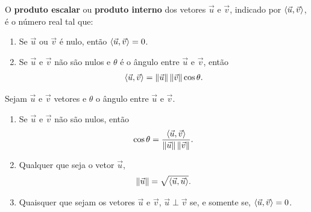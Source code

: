 \documentclass{beamer}
\begin{document}
    \begin{frame}
        \begin{definicao}\label{produtointerno}
          O \textbf{produto escalar} ou \textbf{produto interno} dos vetores $\vec{u}$ e $\vec{v}$, indicado por $\langle \vec{u}, \vec{v} \rangle$, é o número real tal que:
          \begin{enumerate}[label=({\roman*})]
            \item Se $\vec{u}$ ou $\vec{v}$ é nulo, então $\langle \vec{u}, \vec{v} \rangle = 0$.
            \item Se $\vec{u}$ e $\vec{v}$ não são nulos e $\theta$ é o ângulo entre $\vec{u}$ e $\vec{v}$, então
            \begin{align}\label{produto-interno}
              \langle \vec{u}, \vec{v} \rangle = \left\Vert{\vec{u}}\right\Vert\left\Vert{\vec{v}}\right\Vert\cos\theta.
            \end{align}
          \end{enumerate}
        \end{definicao}
    \end{frame}

    \begin{frame}
        \begin{proposicao}
          Sejam $\vec{u}$ e $\vec{v}$ vetores e $\theta$ o ângulo entre $\vec{u}$ e $\vec{v}$.
          \begin{enumerate}[label=({\roman*})]
            \item Se $\vec{u}$ e $\vec{v}$ não são nulos, então
            \[
              \cos\theta = \dfrac{\langle \vec{u}, \vec{v} \rangle}{\left\Vert{\vec{u}}\right\Vert\left\Vert{\vec{v}}\right\Vert}.
            \]
            \item Qualquer que seja o vetor $\vec{u}$,
            \[
              \left\Vert{\vec{u}}\right\Vert = \sqrt{\langle \vec{u}, \vec{u} \rangle}.
            \]
            \item Quaisquer que sejam os vetores $\vec{u}$ e $\vec{v}$, $\vec{u}\perp\vec{v}$ se, e somente se, $\langle \vec{u}, \vec{v} \rangle = 0$.
            \end{enumerate}
        \end{proposicao}
   \end{frame}
\end{document}
